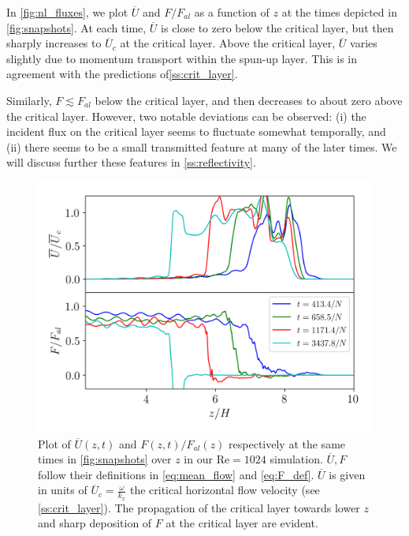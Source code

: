 \documentclass[
        fleqn,
        usenatbib,
    ]{mnras}
\begin{document}
In \autoref{fig:nl_fluxes}, we plot $\overline{U}$ and $F / F_{al}$ as a function
of $z$ at the times depicted in \autoref{fig:snapshots}.
At each time, $\overline{U}$ is close to zero below the critical layer, but then
sharply increases to $\overline{U}_c$ at the critical layer. Above the critical
layer, $\overline{U}$ varies slightly due to momentum transport within the
spun-up layer. This is in agreement with the predictions
of\autoref{ss:crit_layer}.

Similarly, $F \lesssim F_{al}$ below the critical layer, and then decreases to
about zero above the critical layer. However, two notable deviations can be
observed: (i) the incident flux on the critical layer seems to fluctuate
somewhat temporally, and (ii) there seems to be a small transmitted feature at
many of the later times. We will discuss further these features in
\autoref{ss:reflectivity}.
\begin{figure}
    \centering
    \includegraphics[width=\columnwidth]{plots/nl_fluxes.png}
    \caption{Plot of $\overline{U}(z, t)$ and $F(z, t) / F_{al}(z)$ respectively
    at the same times in \autoref{fig:snapshots} over $z$ in our $\mathrm{Re} =
    1024$ simulation. $\overline{U}, F$ follow their definitions in
    \autoref{eq:mean_flow} and \autoref{eq:F_def}. $\overline{U}$ is given in
    units of $\overline{U}_c = \frac{\omega}{k_{x}}$ the critical horizontal
    flow velocity (see \autoref{ss:crit_layer}). The propagation of the critical
    layer towards lower $z$ and sharp deposition of $F$ at the critical layer
    are evident.}\label{fig:nl_fluxes}
\end{figure}
\end{document}
